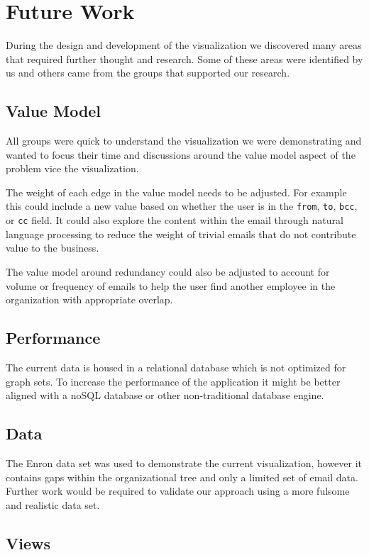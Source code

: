 \documentclass[journal]{vgtc}                %
\begin{document}
\section{Future Work}
\label{sec:future}
During the design and development of the visualization we discovered many areas that required further thought and research.  Some of these areas were identified by us and others came from the groups that supported our research.

\subsection{Value Model}
All groups were quick to understand the visualization we were demonstrating and wanted to focus their time and discussions around the value model aspect of the problem vice the visualization.

The weight of each edge in the value model needs to be adjusted.  For example this could include a new value based on whether the user is in the \texttt{from}, \texttt{to}, \texttt{bcc}, or \texttt{cc} field.  It could also explore the content within the email through natural language processing to reduce the weight of trivial emails that do not contribute value to the business.

The value model around redundancy could also be adjusted to account for volume or frequency of emails to help the user find another employee in the organization with appropriate overlap.

\subsection{Performance}

The current data is housed in a relational database which is not optimized for graph sets.  To increase the performance of the application it might be better aligned with a noSQL database or other non-traditional database engine.

\subsection{Data}

The Enron data set was used to demonstrate the current visualization, however it contains gaps within the organizational tree and only a limited set of email data.  Further work would be required to validate our approach using a more fulsome and realistic data set.

\subsection{Views}
\end{document}
